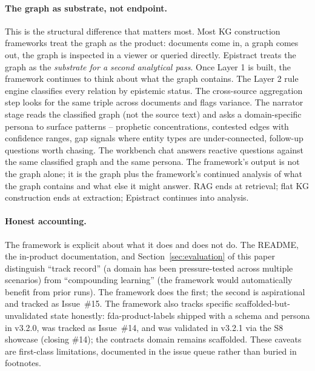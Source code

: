 \paragraph{The graph as substrate, not endpoint.}
This is the structural difference that matters most. Most KG construction frameworks treat the graph as the product: documents come in, a graph comes out, the graph is inspected in a viewer or queried directly. Epistract treats the graph as the \emph{substrate for a second analytical pass}. Once Layer 1 is built, the framework continues to think about what the graph contains. The Layer 2 rule engine classifies every relation by epistemic status. The cross-source aggregation step looks for the same triple across documents and flags variance. The narrator stage reads the classified graph (not the source text) and asks a domain-specific persona to surface patterns -- prophetic concentrations, contested edges with confidence ranges, gap signals where entity types are under-connected, follow-up questions worth chasing. The workbench chat answers reactive questions against the same classified graph and the same persona. The framework's output is not the graph alone; it is the graph plus the framework's continued analysis of what the graph contains and what else it might answer. RAG ends at retrieval; flat KG construction ends at extraction; Epistract continues into analysis.

\paragraph{Honest accounting.}
The framework is explicit about what it does and does not do. The README, the in-product documentation, and Section~\ref{sec:evaluation} of this paper distinguish ``track record'' (a domain has been pressure-tested across multiple scenarios) from ``compounding learning'' (the framework would automatically benefit from prior runs). The framework does the first; the second is aspirational and tracked as Issue~\#15. The framework also tracks specific scaffolded-but-unvalidated state honestly: fda-product-labels shipped with a schema and persona in v3.2.0, was tracked as Issue~\#14, and was validated in v3.2.1 via the S8 showcase (closing \#14); the contracts domain remains scaffolded. These caveats are first-class limitations, documented in the issue queue rather than buried in footnotes.
